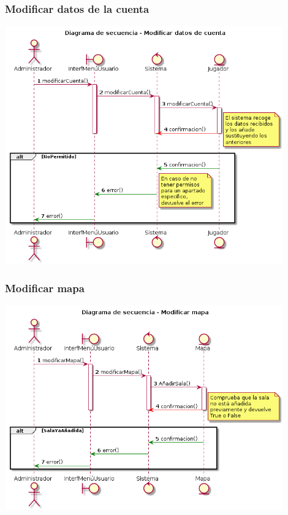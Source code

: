 \subsubsection{Modificar datos de la cuenta}
  \includegraphics[width=0.9\textwidth]{./imatges/administrador/Modificar_datos_de_cuenta.png}
\subsubsection{Modificar mapa}
  \includegraphics[width=0.9\textwidth]{./imatges/administrador/Modificar_mapa.png}
